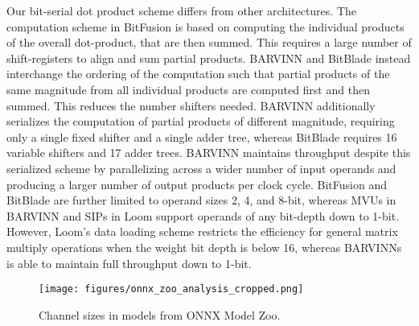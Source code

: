 \documentclass[sigconf]{acmart}
\newcommand{\MVU}{MVU}
\newcommand{\BARVINN}{BARVINN}
\begin{document}
Our bit-serial dot product scheme differs from other architectures. The computation scheme in BitFusion is based on computing the individual products of the overall dot-product, that are then summed. This requires a large number of shift-registers to align and sum partial products. \BARVINN{} and BitBlade instead interchange the ordering of the computation such that partial products of the same magnitude from all individual products are computed first and then summed. This reduces the number shifters needed. \BARVINN{} additionally serializes the computation of partial products of different magnitude, requiring only a single fixed shifter and a single adder tree, whereas BitBlade requires 16 variable shifters and 17 adder trees. \BARVINN{} maintains throughput despite this serialized scheme by parallelizing across a wider number of input operands and producing a larger number of output products per clock cycle. BitFusion and BitBlade are further limited to operand sizes 2, 4, and 8-bit, whereas \MVU s in \BARVINN{} and SIPs in Loom support operands of any bit-depth down to 1-bit. However, Loom's data loading scheme restricts the efficiency for general matrix multiply operations when the weight bit depth is below 16, whereas \BARVINN{}s is able to maintain full throughput down to 1-bit.


\begin{figure}[t]
        \centering
            \texttt{[image: figures/onnx\_zoo\_analysis\_cropped.png]}
        \caption{Channel sizes in models from ONNX Model Zoo.}
        \label{fig:ONNX_ZOO_ANALYSIS}
        \vspace{-2.5mm}
\end{figure}

\end{document}
